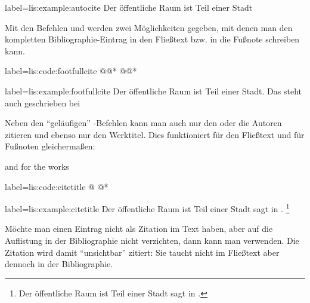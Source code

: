 \begin{lfgwexample}{label={lis:example:autocite}}
Der öffentliche Raum ist Teil einer Stadt \autocite{Osland2016} 
\end{lfgwexample}

Mit den Befehlen  und  werden zwei Möglichkeiten gegeben,
mit denen man den kompletten Bibliographie-Eintrag in den Fließtext bzw. in die Fußnote schreiben kann.
\begin{lfgwcode}{label={lis:code:footfullcite}}
\fullcite*@@*
\footfullcite*@@*
\end{lfgwcode} 

\begin{lfgwexample}{label={lis:example:footfullcite}}
Der öffentliche Raum ist Teil einer Stadt.
Das steht auch geschrieben bei 
\end{lfgwexample}



Neben den \enquote{geläufigen} -Befehlen kann man auch nur den oder die Autoren zitieren 
und ebenso nur den Werktitel.
Dies funktioniert für den Fließtext und für Fußnoten gleichermaßen:
  and for the works 
\begin{lfgwcode}{label={lis:code:citetitle}}
\citetitle *@ @*
\end{lfgwcode} 

\begin{lfgwexample}{label={lis:example:citetitle}}
Der öffentliche Raum ist Teil einer Stadt sagt \citeauthor{Osland2016} in .
\footnote{Der öffentliche Raum ist Teil einer Stadt sagt \citeauthor{Osland2016} in .}
\end{lfgwexample}


Möchte man einen Eintrag nicht als Zitation im Text haben, 
aber auf die Auflistung in der Bibliographie nicht verzichten,
dann kann man  verwenden.
Die Zitation wird damit \enquote{unsichtbar} zitiert:
Sie taucht nicht im Fließtext aber dennoch in der Bibliographie.

